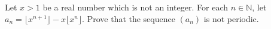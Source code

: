 Let $x > 1$ be a real number which is not an integer. For each $n\in\mathbb{N}$, let $a_n=\lfloor x^{n+1}\rfloor - x\lfloor x^n\rfloor$. Prove that the sequence $(a_n)$ is not periodic.
